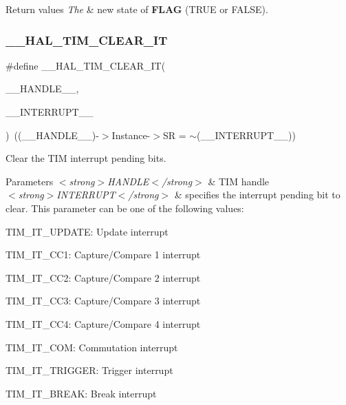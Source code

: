 \begin{DoxyRetVals}{Return values}
{\em The} & new state of {\bfseries{F\+L\+AG}} (T\+R\+UE or F\+A\+L\+SE). \\
\hline
\end{DoxyRetVals}
\mbox{\label{group___t_i_m___exported___macros_gaea68155ce77e591e0c2582def061d6f0}} 
\subsubsection{\texorpdfstring{\_\_HAL\_TIM\_CLEAR\_IT}{\_\_HAL\_TIM\_CLEAR\_IT}}
{\footnotesize\ttfamily \#define \+\_\+\+\_\+\+H\+A\+L\+\_\+\+T\+I\+M\+\_\+\+C\+L\+E\+A\+R\+\_\+\+IT(\begin{DoxyParamCaption}\item[{}]{\+\_\+\+\_\+\+H\+A\+N\+D\+L\+E\+\_\+\+\_\+,  }\item[{}]{\+\_\+\+\_\+\+I\+N\+T\+E\+R\+R\+U\+P\+T\+\_\+\+\_\+ }\end{DoxyParamCaption})~((\+\_\+\+\_\+\+H\+A\+N\+D\+L\+E\+\_\+\+\_\+)-\/$>$Instance-\/$>$SR = $\sim$(\+\_\+\+\_\+\+I\+N\+T\+E\+R\+R\+U\+P\+T\+\_\+\+\_\+))}



Clear the T\+IM interrupt pending bits. 


\begin{DoxyParams}{Parameters}
{\em $<$strong$>$\+H\+A\+N\+D\+L\+E$<$/strong$>$} & T\+IM handle \\
\hline
{\em $<$strong$>$\+I\+N\+T\+E\+R\+R\+U\+P\+T$<$/strong$>$} & specifies the interrupt pending bit to clear. This parameter can be one of the following values\+: \begin{DoxyItemize}
\item T\+I\+M\+\_\+\+I\+T\+\_\+\+U\+P\+D\+A\+TE\+: Update interrupt \item T\+I\+M\+\_\+\+I\+T\+\_\+\+C\+C1\+: Capture/\+Compare 1 interrupt \item T\+I\+M\+\_\+\+I\+T\+\_\+\+C\+C2\+: Capture/\+Compare 2 interrupt \item T\+I\+M\+\_\+\+I\+T\+\_\+\+C\+C3\+: Capture/\+Compare 3 interrupt \item T\+I\+M\+\_\+\+I\+T\+\_\+\+C\+C4\+: Capture/\+Compare 4 interrupt \item T\+I\+M\+\_\+\+I\+T\+\_\+\+C\+OM\+: Commutation interrupt \item T\+I\+M\+\_\+\+I\+T\+\_\+\+T\+R\+I\+G\+G\+ER\+: Trigger interrupt \item T\+I\+M\+\_\+\+I\+T\+\_\+\+B\+R\+E\+AK\+: Break interrupt \end{DoxyItemize}
\\
\hline
\end{DoxyParams}

